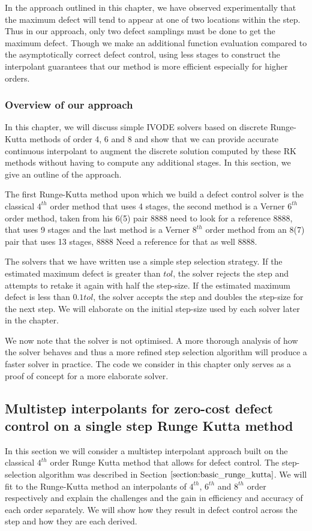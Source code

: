 \documentclass{article}
\begin{document}
In the approach outlined in this chapter, we have observed experimentally that the maximum defect will tend to appear at one of two locations within the step. Thus in our approach, only two defect samplings must be done to get the maximum defect. Though we make an additional function evaluation compared to the asymptotically correct defect control, using less stages to construct the interpolant guarantees that our method is more efficient especially for higher orders.


\subsubsection{Overview of our approach}
\label{section:basic_runge_kutta}
In this chapter, we will discuss simple IVODE solvers based on discrete Runge-Kutta methods of order 4, 6 and 8 and show that we can provide accurate continuous interpolant to augment the discrete solution computed by these RK methods without having to compute any additional stages. In this section, we give an outline of the approach.

The first Runge-Kutta method upon which we build a defect control solver is the classical $4^{th}$ order method that uses 4 stages, the second method is a Verner $6^{th}$ order method, taken from his 6(5) pair 8888 need to look for a reference 8888, that uses 9 stages and the last method is a Verner $8^{th}$ order method from an 8(7) pair that uses 13 stages, 8888 Need a reference for that as well 8888. 

The solvers that we have written use a simple step selection strategy. If the estimated maximum defect is greater than $tol$, the solver rejects the step and attempts to retake it again with half the step-size. If the estimated maximum defect is less than $0.1tol$, the solver accepts the step and doubles the step-size for the next step. We will elaborate on the initial step-size used by each solver later in the chapter.

We now note that the solver is not optimised. A more thorough analysis of how the solver behaves and thus a more refined step selection algorithm will produce a faster solver in practice. The code we consider in this chapter only serves as a proof of concept for a more elaborate solver. 

\subsection{Multistep interpolants for zero-cost defect control on a single step Runge Kutta method}
\label{section:equipping_rk4_with_HBs}
In this section we will consider a multistep interpolant approach built on the classical $4^{th}$ order Runge Kutta method that allows for defect control. The step-selection algorithm was described in Section $\ref{section:basic_runge_kutta}$. We will fit to the Runge-Kutta method an interpolants of $4^{th}$, $6^{th}$ and $8^{th}$ order respectively and explain the challenges and the gain in efficiency and accuracy of each order separately. We will show how they result in defect control across the step and how they are each derived.
\end{document}
